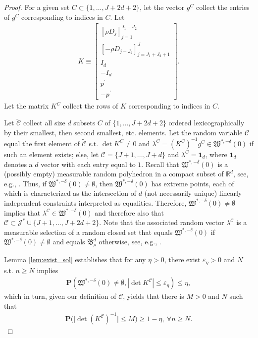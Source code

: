 \documentclass[letterpaper,11pt]{article}
\theoremstyle{myplain}
\theoremstyle{mydefinition}
\theoremstyle{myremark}
\renewcommand{\cite}{\citet}
\newcommand{\cC}{\mathcal{C}}
\newcommand{\cJ}{\mathcal{J}}
\numberwithin{equation}{section}
\numberwithin{figure}{section}
\begin{document}
\begin{appendices}
\begin{proof}
For a given set $C \subset \{1,\dots,J+2d+2\}$, let the vector $g^C$ collect the entries of $g^C$ corresponding to indices in $C$. 
Let \begin{align}
K  \equiv 
\begin{bmatrix}
[\rho D_{j}]_{j=1}^{J_1+J_2}\\
[-\rho D_{j-J_2}]_{j=J_1+J_2+1}^J\\
I_d\\
-I_d\\
p^\prime\\
-p^\prime
\end{bmatrix}. 
\end{align}
Let the matrix $K^C$ collect the rows of $K$ corresponding to indices in $C$.

Let $\widetilde{\cC}$ collect all size $d$ subsets $C$ of $\{1,...,J+2d+2\}$ ordered
lexicographically by their smallest, then second smallest, etc. elements.
Let the random variable $\cC$  equal the first element of $\widetilde{\cC}$ s.t. $\det K^C\neq 0$ and $\lambda^{C}=( K^C)
^{-1}g^C\in \mathfrak W^{* ,-\delta }(0)$ if such an
element exists; else, let $\cC=\{J+1,...,J+d\}$ and $\lambda^{C}= \mathbf{1}_d$, where $\mathbf{1}_d$ denotes a $d$ vector with each entry equal to $1$. Recall that $\mathfrak W^{* ,-\delta }(0)$ is a (possibly empty) measurable random polyhedron in a compact subset of $\mathbb{R}^{d}$, see, e.g., \cite[Definition 1.1.1]{mo1}. Thus, if $\mathfrak W^{* ,-\delta }(0)\neq \emptyset$, then $\mathfrak W^{* ,-\delta }(0)$ has extreme points, each of which is characterized as the intersection of $d$ (not necessarily unique) linearly independent constraints interpreted
as equalities. Therefore, $\mathfrak W^{* ,-\delta }(0)\neq
\emptyset $ implies that $\lambda ^{\cC}\in \mathfrak W^{* ,-\delta }(0)$ and therefore also that $\cC\subset \cJ^* \cup \{J+1,\dots,J+2d+2\}$. Note that the associated random vector $\lambda^{\cC}$ is a measurable selection of a random closed set that equals $\mathfrak W^{*,-\delta}(0)$ if $\mathfrak W^{*,-\delta}(0)\neq \emptyset$ and equals $\mathfrak B^d_\rho$ otherwise, see, e.g., \cite[Definition 1.2.2]{mo1}.

Lemma \ref{lem:exist_sol} establishes that for any $\eta >0$, there exist $\varepsilon_\eta>0$
and $N$ s.t. $n\geq N$ implies
\begin{align}
\mathbf{P} \left( \mathfrak W^{*,-\delta}(0) \neq
\emptyset ,\left\vert \det K^{\cC}\right\vert \leq \varepsilon_\eta\right) \leq \eta,\label{eq:det_bound}
\end{align}
 which in turn, given our definition of $\cC$,  yields that there is $M>0$ and $N$ such that
\begin{align}
\mathbf P\Big(\big|\det \left(K^{\cC}\right)^{-1} \big|\le M\Big)\ge 1-\eta,~\forall n\ge N. \label{eq:det_inv_Op1}
\end{align}


\end{proof}
\end{appendices}
\end{document}
